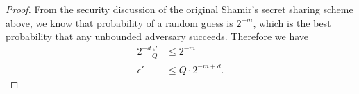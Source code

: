 \documentclass[envcountsame,runningheads,notitlepage]{llncs}
\begin{document}
\begin{proof}
		From the security discussion of the original Shamir's secret sharing scheme above, we know that probability of a random guess is $2^{-m}$, which is the best probability that any unbounded adversary succeeds. 
		Therefore we have 
		\begin{align*}
			2^{-d}\frac{\epsilon'}{Q} &\leq 2^{-m}\\
			\epsilon' &\leq Q \cdot 2^{-m+d}.
		\end{align*}
	\end{proof}
	 
	 
	
	
	
	
\end{document}
